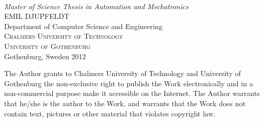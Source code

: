 \begin{titlepage}

\mbox{}
\vfill
\addtolength{\voffset}{2cm}
\begin{flushleft}
	{ \\[0.5cm]
	\emph{\Large Master of Science Thesis in Automation and Mechatronics} \\[.8cm]
	
	{\huge EMIL DJUPFELDT}\\[.8cm]
	
	{\Large Department of Computer Science and Engineering\\
	\textsc{Chalmers University of Technology} \\
	\textsc{University of Gothenburg} \\
	Gothenburg, Sweden 2012 \\
	} 
	}
\end{flushleft}

\end{titlepage}
\ClearShipoutPicture


\pagestyle{empty}
\newpage
\clearpage
The Author grants to Chalmers University of Technology and University of Gothenburg  the non-exclusive right to publish the Work electronically and in a non-commercial purpose make it accessible on the Internet. 
The Author warrants that he/she is the author to the Work, and warrants that the Work does not contain text, pictures or other material that violates copyright law.

